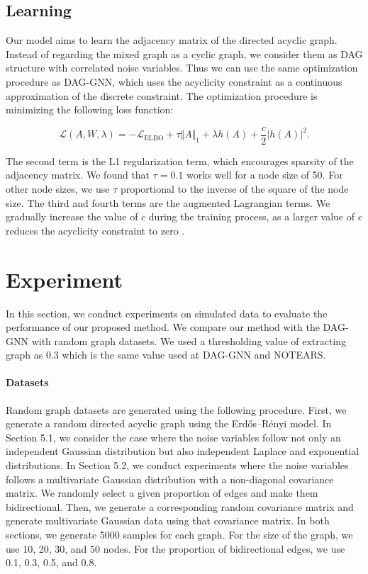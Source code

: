 \documentclass[10pt]{article}
\begin{document}
\subsection{Learning}

Our model aims to learn the adjacency matrix of the directed acyclic graph. Instead of regarding the mixed graph as a cyclic graph, we consider them as DAG structure with correlated noise variables. Thus we can use the same optimization procedure as DAG-GNN, which uses the acyclicity constraint as a continuous approximation of the discrete constraint. The optimization procedure is minimizing the following loss function:

\begin{equation}
    \mathcal{L}(A, W, \lambda) =-\mathcal{L}_{\mathrm{ELBO}} + \tau \Vert A \Vert_1 + \lambda h(A) + \frac{c}{2} |h(A)|^2.
\end{equation}

The second term is the L1 regularization term, which encourages sparsity of the adjacency matrix. We found that $\tau=0.1$ works well for a node size of 50. For other node sizes, we use $\tau$ proportional to the inverse of the square of the node size. The third and fourth terms are the augmented Lagrangian terms. We gradually increase the value of $c$ during the training process, as a larger value of $c$ reduces the acyclicity constraint to zero \cite{yu2019daggnn}.


\section{Experiment}

In this section, we conduct experiments on simulated data to evaluate the performance of our proposed method. We compare our method with the DAG-GNN \cite{yu2019daggnn} with random graph datasets. We used a thresholding value of extracting graph as 0.3 which is the same value used at DAG-GNN and NOTEARS.\\ 

\paragraph*{Datasets} Random graph datasets are generated using the following procedure. First, we generate a random directed acyclic graph using the Erdős–Rényi model. In Section 5.1, we consider the case where the noise variables follow not only an independent Gaussian distribution but also independent Laplace and exponential distributions. In Section 5.2, we conduct experiments where the noise variables follows a multivariate Gaussian distribution with a non-diagonal covariance matrix. We randomly select a given proportion of edges and make them bidirectional. Then, we generate a corresponding random covariance matrix and generate multivariate Gaussian data using that covariance matrix. In both sections, we generate 5000 samples for each graph. For the size of the graph, we use 10, 20, 30, and 50 nodes. For the proportion of bidirectional edges, we use 0.1, 0.3, 0.5, and 0.8. \\
\end{document}
